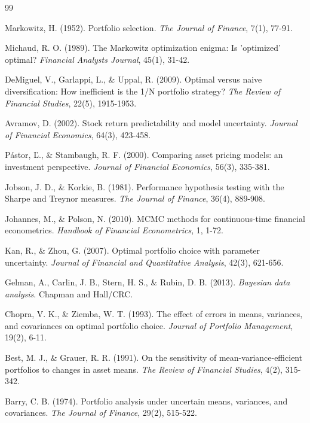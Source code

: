 \documentclass[12pt,a4paper,oneside]{book}
\theoremstyle{definition}
\begin{document}
\begin{thebibliography}{99}

Markowitz, H. (1952). Portfolio selection. \textit{The Journal of Finance}, 7(1), 77-91.

Michaud, R. O. (1989). The Markowitz optimization enigma: Is 'optimized' optimal? \textit{Financial Analysts Journal}, 45(1), 31-42.

DeMiguel, V., Garlappi, L., \& Uppal, R. (2009). Optimal versus naive diversification: How inefficient is the 1/N portfolio strategy? \textit{The Review of Financial Studies}, 22(5), 1915-1953.

Avramov, D. (2002). Stock return predictability and model uncertainty. \textit{Journal of Financial Economics}, 64(3), 423-458.

Pástor, Ľ., \& Stambaugh, R. F. (2000). Comparing asset pricing models: an investment perspective. \textit{Journal of Financial Economics}, 56(3), 335-381.

Jobson, J. D., \& Korkie, B. (1981). Performance hypothesis testing with the Sharpe and Treynor measures. \textit{The Journal of Finance}, 36(4), 889-908.

Johannes, M., \& Polson, N. (2010). MCMC methods for continuous-time financial econometrics. \textit{Handbook of Financial Econometrics}, 1, 1-72.

Kan, R., \& Zhou, G. (2007). Optimal portfolio choice with parameter uncertainty. \textit{Journal of Financial and Quantitative Analysis}, 42(3), 621-656.

Gelman, A., Carlin, J. B., Stern, H. S., \& Rubin, D. B. (2013). \textit{Bayesian data analysis}. Chapman and Hall/CRC.

Chopra, V. K., \& Ziemba, W. T. (1993). The effect of errors in means, variances, and covariances on optimal portfolio choice. \textit{Journal of Portfolio Management}, 19(2), 6-11.

Best, M. J., \& Grauer, R. R. (1991). On the sensitivity of mean-variance-efficient portfolios to changes in asset means. \textit{The Review of Financial Studies}, 4(2), 315-342.

Barry, C. B. (1974). Portfolio analysis under uncertain means, variances, and covariances. \textit{The Journal of Finance}, 29(2), 515-522.


\end{thebibliography}
\end{document}
